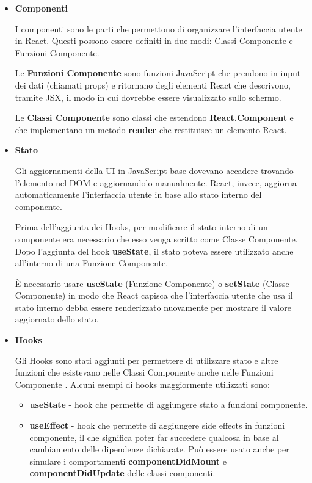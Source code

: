 \documentclass[a4paper,12pt]{report}
\begin{document}
				\begin{itemize}
				\item \textbf{Componenti}

				I componenti sono le parti che permettono di organizzare l'interfaccia utente in React. Questi possono essere definiti in due modi: Classi Componente e Funzioni Componente. \cite{componentireact} 

				Le \textbf{Funzioni Componente} sono funzioni JavaScript che prendono in input dei dati (chiamati props) e ritornano degli elementi React che descrivono, tramite JSX, il modo in cui dovrebbe essere visualizzato sullo schermo. \cite{tipicomponenti} 

				Le \textbf{Classi Componente} sono classi che estendono \textbf{React.Component} e che implementano un metodo \textbf{render} che restituisce un elemento React. 

				\item \textbf{Stato} 

				Gli aggiornamenti della UI in JavaScript base dovevano accadere trovando l'elemento nel DOM e aggiornandolo manualmente. React, invece, aggiorna automaticamente l'interfaccia utente in base allo stato interno del componente. 

Prima dell'aggiunta dei Hooks, per modificare il stato interno di un componente era necessario che esso venga scritto come Classe Componente. Dopo l'aggiunta del hook \textbf{useState}, il stato poteva essere utilizzato anche all'interno di una Funzione Componente. 

È necessario usare \textbf{useState} (Funzione Componente) o \textbf{setState} (Classe Componente) in modo che React capisca che l'interfaccia utente che usa il stato interno debba essere renderizzato nuovamente per mostrare il valore aggiornato dello stato. \cite{statoreact} 

				\item \textbf{Hooks} 

				Gli Hooks sono stati aggiunti per permettere di utilizzare stato e altre funzioni che esistevano nelle Classi Componente anche nelle Funzioni Componente \cite{hooksreact}. Alcuni esempi di hooks maggiormente utilizzati sono: 

				\begin{itemize}
				\item \textbf{useState} - hook che permette di aggiungere stato a funzioni componente.
				\item \textbf{useEffect} - hook che permette di aggiungere side effects in funzioni componente, il che significa poter far succedere qualcosa in base al cambiamento delle dipendenze dichiarate. Può essere usato anche per simulare i comportamenti \textbf{componentDidMount} e \textbf{componentDidUpdate} delle classi componenti.


\end{itemize}
\end{itemize}
\end{document}
